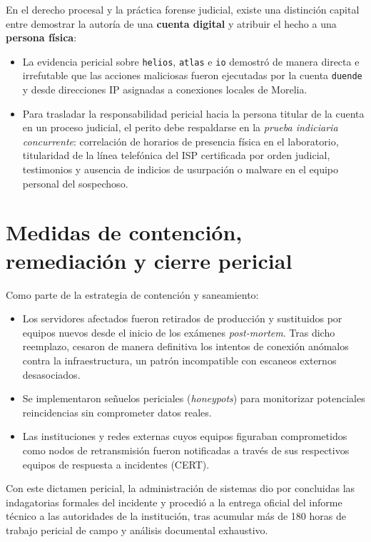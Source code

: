 \begin{notaforense}
En el derecho procesal y la práctica forense judicial, existe una distinción capital entre demostrar la autoría de una \textbf{cuenta digital} y atribuir el hecho a una \textbf{persona física}:
\begin{itemize}
    \item La evidencia pericial sobre \texttt{helios}, \texttt{atlas} e \texttt{io} demostró de manera directa e irrefutable que las acciones maliciosas fueron ejecutadas por la cuenta \texttt{duende} y desde direcciones IP asignadas a conexiones locales de Morelia.
    \item Para trasladar la responsabilidad pericial hacia la persona titular de la cuenta en un proceso judicial, el perito debe respaldarse en la \textit{prueba indiciaria concurrente}: correlación de horarios de presencia física en el laboratorio, titularidad de la línea telefónica del ISP certificada por orden judicial, testimonios y ausencia de indicios de usurpación o malware en el equipo personal del sospechoso.
\end{itemize}
\end{notaforense}

\section{Medidas de contención, remediación y cierre pericial}

Como parte de la estrategia de contención y saneamiento:
\begin{itemize}
    \item Los servidores afectados fueron retirados de producción y sustituidos por equipos nuevos desde el inicio de los exámenes \textit{post-mortem}. Tras dicho reemplazo, cesaron de manera definitiva los intentos de conexión anómalos contra la infraestructura, un patrón incompatible con escaneos externos desasociados.
    \item Se implementaron señuelos periciales (\textit{honeypots}) para monitorizar potenciales reincidencias sin comprometer datos reales.
    \item Las instituciones y redes externas cuyos equipos figuraban comprometidos como nodos de retransmisión fueron notificadas a través de sus respectivos equipos de respuesta a incidentes (CERT).
\end{itemize}

Con este dictamen pericial, la administración de sistemas dio por concluidas las indagatorias formales del incidente y procedió a la entrega oficial del informe técnico a las autoridades de la institución, tras acumular más de 180 horas de trabajo pericial de campo y análisis documental exhaustivo.

